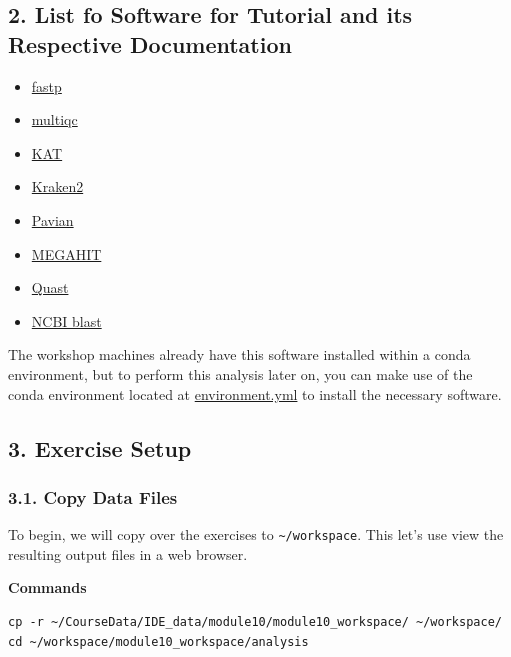\documentclass[
]{book}
\providecommand{\tightlist}{%
  \setlength{\itemsep}{0pt}\setlength{\parskip}{0pt}}
\begin{document}
\subsection{2. List fo Software for Tutorial and its Respective Documentation}\label{list-fo-software-for-tutorial-and-its-respective-documentation}

\begin{itemize}
\tightlist
\item
  \href{https://github.com/OpenGene/fastp}{fastp}
\item
  \href{https://multiqc.info/}{multiqc}
\item
  \href{https://kat.readthedocs.io/en/latest/}{KAT}
\item
  \href{https://ccb.jhu.edu/software/kraken2/}{Kraken2}
\item
  \href{https://fbreitwieser.shinyapps.io/pavian/}{Pavian}
\item
  \href{https://github.com/voutcn/megahit}{MEGAHIT}
\item
  \href{http://quast.sourceforge.net/quast}{Quast}
\item
  \href{https://blast.ncbi.nlm.nih.gov/Blast.cgi}{NCBI blast}
\end{itemize}

The workshop machines already have this software installed within a conda environment, but to perform this analysis later on, you can make use of the conda environment located at \href{https://bioinformaticsdotca.github.io/IDE_2024/module10/environment.yml}{environment.yml} to install the necessary software.

\subsection{3. Exercise Setup}\label{exercise-setup-1}

\subsubsection{3.1. Copy Data Files}\label{copy-data-files-1}

To begin, we will copy over the exercises to \texttt{\textasciitilde{}/workspace}. This let's use view the resulting output files in a web browser.

\textbf{Commands}

\begin{verbatim}
cp -r ~/CourseData/IDE_data/module10/module10_workspace/ ~/workspace/
cd ~/workspace/module10_workspace/analysis
\end{verbatim}
\end{document}

